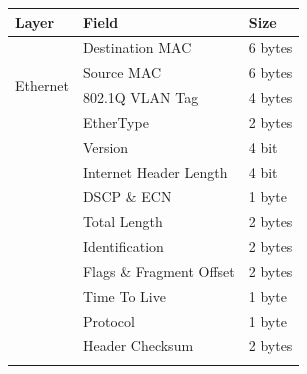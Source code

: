 \documentclass[twocolumn]{article}
\begin{document}
\begin{table}
  \begin{center}
    \small
    \begin{tabular}{|l|l|l|}
      \hline
      \textbf{Layer}                & \textbf{Field}                             & \textbf{Size}               \\\hline
      \multirow{4}{4em}{Ethernet}
                                    & Destination MAC                            & 6 bytes                     \\\hhline{|~|-|-|}
                                    & Source MAC                                 & 6 bytes                     \\\hhline{|~|-|-|}
                                    & \cellcolor{gray!20}802.1Q VLAN Tag         & \cellcolor{gray!20}4 bytes  \\\hhline{|~|-|-|}
                                    & EtherType                                  & 2 bytes                     \\\hhline{|-|-|-|}
      \multirow{12}{4em}{IPv4}      & Version                                    & 4 bit                       \\\hhline{|~|-|-|}
                                    & \cellcolor{green!10}Internet Header Length & \cellcolor{green!10}4 bit   \\\hhline{|~|-|-|}
                                    & DSCP \& ECN                                & 1 byte                      \\\hhline{|~|-|-|}
                                    & \cellcolor{green!10}Total Length           & \cellcolor{green!10}2 bytes \\\hhline{|~|-|-|}
                                    & Identification                             & 2 bytes                     \\\hhline{|~|-|-|}
                                    & Flags \& Fragment Offset                   & 2 bytes                     \\\hhline{|~|-|-|}
                                    & Time To Live                               & 1 byte                      \\\hhline{|~|-|-|}
                                    & Protocol                                   & 1 byte                      \\\hhline{|~|-|-|}
                                    & \cellcolor{blue!10}Header Checksum         & \cellcolor{blue!10}2 bytes  \\\hhline{|~|-|-|}

\end{tabular}
\end{center}
\end{table}
\end{document}
